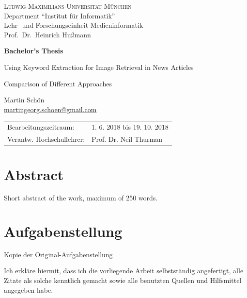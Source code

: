 \documentclass[11pt,a4paper,twoside]{article}
\begin{document}
\pagestyle{empty} %

\begin{center}
\textsc{Ludwig-Maximilians-Universität München}\\
Department ``Institut für Informatik''\\
Lehr- und Forschungseinheit Medieninformatik\\
Prof.\ Dr.\ Heinrich Hußmann

\vspace{5cm}
{\large\textbf{Bachelor's Thesis}}\vspace{.5cm}

{\LARGE Using Keyword Extraction for Image Retrieval in News Articles}\vspace{.3cm}

{\Large Comparison of Different Approaches}\vspace{1cm}

{\large Martin Schön}\\\href{mailto:martingeorg.schoen@gmail.com}{martingeorg.schoen@gmail.com}

\end{center}
\vfill

\begin{tabular}{ll}
Bearbeitungszeitraum: & 1. 6. 2018 bis 19. 10. 2018\\
Verantw. Hochschullehrer: & Prof. Dr. Neil Thurman
\end{tabular}

\clearpage
{}
\section*{Abstract}

Short abstract of the work, maximum of 250 words.

\clearpage
\section*{Aufgabenstellung}

Kopie der Original-Aufgabenstellung

\vfill %

\noindent Ich erkläre hiermit, dass ich die vorliegende Arbeit
selbstständig angefertigt, alle Zitate als solche kenntlich gemacht
sowie alle benutzten Quellen und Hilfsmittel angegeben habe.
\end{document}
